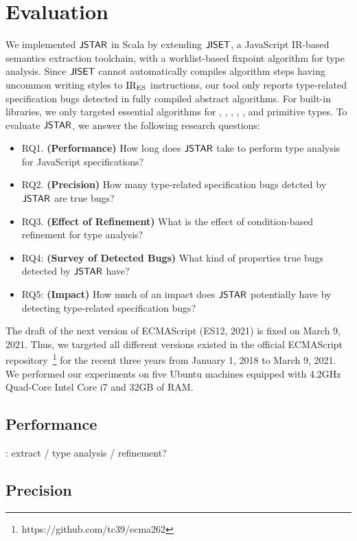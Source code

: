 \section{Evaluation}\label{sec:eval}

We implemented $\textsf{JSTAR}$ in Scala by extending $\textsf{JISET}$, a JavaScript IR-based
semantics extraction toolchain, with a worklist-based fixpoint algorithm for
type analysis.  Since $\textsf{JISET}$ cannot automatically compiles algorithm steps
having uncommon writing styles to ${\text{IR}_\text{ES}}$ instructions, our tool only reports
type-related specification bugs detected in fully compiled abstract algorithms.
For built-in libraries, we only targeted essential algorithms for
, , , ,
, and primitive types.  To evaluate $\textsf{JSTAR}$, we answer the
following research questions:
\begin{itemize}
  \item RQ1. \textbf{(Performance)} How long does $\textsf{JSTAR}$ take to perform type
    analysis for JavaScript specifications?
  \item RQ2. \textbf{(Precision)} How many type-related specification bugs
    detcted by $\textsf{JSTAR}$ are true bugs?
  \item RQ3. \textbf{(Effect of Refinement)} What is the effect of
    condition-based refinement for type analysis?
  \item RQ4: \textbf{(Survey of Detected Bugs)} What kind of properties true
    bugs detected by $\textsf{JSTAR}$ have?
  \item RQ5: \textbf{(Impact)} How much of an impact does $\textsf{JSTAR}$ potentially
    have by detecting type-related specification bugs?
\end{itemize}
The draft of the next version of ECMAScript (ES12, 2021) is fixed on March 9,
2021.  Thus, we targeted all different  versions existed in the
official ECMAScript repository~\footnote{https://github.com/tc39/ecma262} for
the recent three years from January 1, 2018 to March 9, 2021.  We performed our
experiments on five Ubuntu machines equipped with 4.2GHz Quad-Core Intel Core i7
and 32GB of RAM.


\subsection{Performance}

\todo: extract / type analysis / refinement?


\subsection{Precision}

